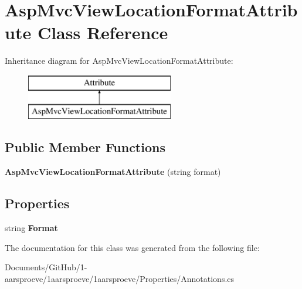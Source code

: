 \hypertarget{class_asp_mvc_view_location_format_attribute}{}\section{Asp\+Mvc\+View\+Location\+Format\+Attribute Class Reference}
\label{class_asp_mvc_view_location_format_attribute}
Inheritance diagram for Asp\+Mvc\+View\+Location\+Format\+Attribute\+:\begin{figure}[H]
\begin{center}
\leavevmode
\includegraphics[height=2.000000cm]{class_asp_mvc_view_location_format_attribute}
\end{center}
\end{figure}
\subsection*{Public Member Functions}
\begin{DoxyCompactItemize}
\item 
\hypertarget{class_asp_mvc_view_location_format_attribute_aecb3c29d8605da500d4af960ba99f207}{}{\bfseries Asp\+Mvc\+View\+Location\+Format\+Attribute} (string format)\label{class_asp_mvc_view_location_format_attribute_aecb3c29d8605da500d4af960ba99f207}

\end{DoxyCompactItemize}
\subsection*{Properties}
\begin{DoxyCompactItemize}
\item 
\hypertarget{class_asp_mvc_view_location_format_attribute_a3489b3971df02310fd8abb286247c4ae}{}string {\bfseries Format}\label{class_asp_mvc_view_location_format_attribute_a3489b3971df02310fd8abb286247c4ae}

\end{DoxyCompactItemize}


The documentation for this class was generated from the following file\+:\begin{DoxyCompactItemize}
\item 
Documents/\+Git\+Hub/1-\/aarsproeve/1aarsproeve/1aarsproeve/\+Properties/Annotations.\+cs\end{DoxyCompactItemize}

